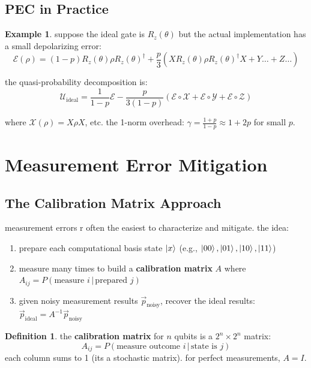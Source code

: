 \documentclass[11pt,a4paper]{article}
\theoremstyle{definition}
\newtheorem{definition}{Definition}[section]
\newtheorem{example}{Example}[section]
\theoremstyle{remark}
\begin{document}
\subsection{PEC in Practice}

\begin{example}
suppose the ideal gate is $R_z(\theta)$ but the actual implementation has a small depolarizing error:
\[
\mathcal{E}(\rho) = (1-p)R_z(\theta)\rho R_z(\theta)^\dagger + \frac{p}{3}(X R_z(\theta)\rho R_z(\theta)^\dagger X + Y \ldots + Z \ldots)
\]

the quasi-probability decomposition is:
\[
\mathcal{U}_{\text{ideal}} = \frac{1}{1-p}\mathcal{E} - \frac{p}{3(1-p)}(\mathcal{E} \circ \mathcal{X} + \mathcal{E} \circ \mathcal{Y} + \mathcal{E} \circ \mathcal{Z})
\]

where $\mathcal{X}(\rho) = X\rho X$, etc. the 1-norm overhead: $\gamma = \frac{1+p}{1-p} \approx 1 + 2p$ for small $p$.
\end{example}

\section{Measurement Error Mitigation}

\subsection{The Calibration Matrix Approach}

measurement errors r often the easiest to characterize and mitigate. the idea:

\begin{enumerate}
    \item prepare each computational basis state $\ket{x}$ (e.g., $\ket{00}, \ket{01}, \ket{10}, \ket{11}$)
    \item measure many times to build a \textbf{calibration matrix} $A$ where $A_{ij} = P(\text{measure } i \,|\, \text{prepared } j)$
    \item given noisy measurement results $\vec{p}_{\text{noisy}}$, recover the ideal results: $\vec{p}_{\text{ideal}} = A^{-1}\vec{p}_{\text{noisy}}$
\end{enumerate}

\begin{definition}
the \textbf{calibration matrix} for $n$ qubits is a $2^n \times 2^n$ matrix:
\[
A_{ij} = P(\text{measure outcome } i \,|\, \text{state is } j)
\]
each column sums to 1 (its a stochastic matrix). for perfect measurements, $A = I$.
\end{definition}
\end{document}
